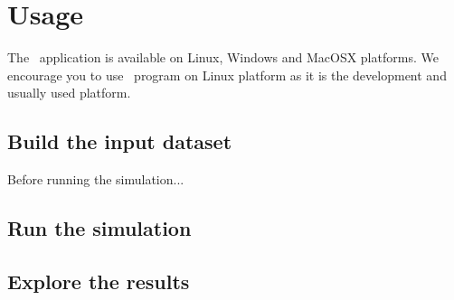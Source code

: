 \chapter{Usage}


The \OFEname \ application is available on Linux, Windows and MacOSX platforms.
We encourage you to use \OFEname \ program on Linux platform as it is the development and usually used platform. 

\section{Build the input dataset}

Before running the simulation...

\bigskip

\section{Run the simulation}

\bigskip

\section{Explore the results}
